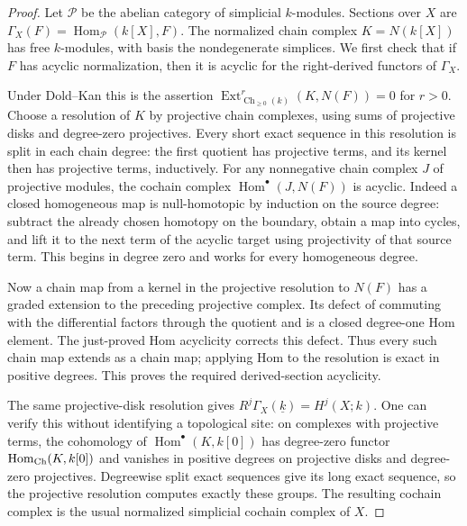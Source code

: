 \begin{proof}
Let $\mathcal P$ be the abelian category of simplicial
$k$-modules.  Sections over $X$ are
$\Gamma_X(F)=\operatorname{Hom}_{\mathcal P}(k[X],F)$.
The normalized chain complex $K=N(k[X])$ has free $k$-modules,
with basis the nondegenerate simplices.  We first check that
if $F$ has acyclic normalization, then it is acyclic for the
right-derived functors of $\Gamma_X$.

Under Dold--Kan this is the assertion
$\operatorname{Ext}^r_{\operatorname{Ch}_{\geq0}(k)}
 (K,N(F))=0$ for $r>0$.
Choose a resolution of $K$ by projective chain complexes,
using sums of projective disks and degree-zero projectives.
Every short exact sequence in this resolution is split in
each chain degree: the first quotient has projective terms,
and its kernel then has projective terms, inductively.
For any nonnegative chain complex $J$ of projective modules,
the cochain complex $\operatorname{Hom}^{\bullet}(J,N(F))$
is acyclic.  Indeed a closed homogeneous map is
null-homotopic by induction on the source degree: subtract
the already chosen homotopy on the boundary, obtain a map
into cycles, and lift it to the next term of the acyclic
target using projectivity of that source term.  This begins
in degree zero and works for every homogeneous degree.

Now a chain map from a kernel in the projective resolution
to $N(F)$ has a graded extension to the preceding projective
complex.  Its defect of commuting with the differential
factors through the quotient and is a closed degree-one
Hom element.  The just-proved Hom acyclicity corrects this
defect.  Thus every such chain map extends as a chain map;
applying Hom to the resolution is exact in positive degrees.
This proves the required derived-section acyclicity.

The same projective-disk resolution gives
$R^j\Gamma_X(\underline{k})=H^j(X;k)$.
One can verify this without identifying a topological site:
on complexes with projective terms, the cohomology of
$\operatorname{Hom}^{\bullet}(K,k[0])$ has degree-zero
functor $\operatorname{Hom}_{\rm Ch}(K,k[0])$ and vanishes
in positive degrees on projective disks and degree-zero
projectives.  Degreewise split exact sequences give its
long exact sequence, so the projective resolution computes
exactly these groups.  The resulting cochain complex is
the usual normalized simplicial cochain complex of $X$.


\end{proof}
